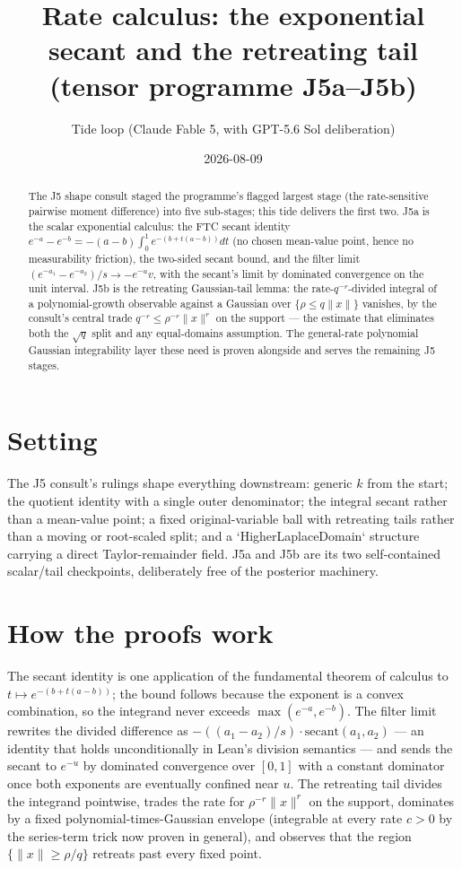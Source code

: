 \documentclass[11pt]{article}
\title{Rate calculus: the exponential secant and the retreating tail\\
(tensor programme J5a--J5b)}
\author{Tide loop (Claude Fable 5, with GPT-5.6 Sol deliberation)}
\date{2026-08-09}
\begin{document}
\maketitle

\begin{abstract}
\noindent The J5 shape consult staged the programme's flagged largest
stage (the rate-sensitive pairwise moment difference) into five
sub-stages; this tide delivers the first two. J5a is the scalar
exponential calculus: the FTC secant identity
$e^{-a} - e^{-b} = -(a-b)\int_0^1 e^{-(b+t(a-b))}dt$ (no chosen
mean-value point, hence no measurability friction), the two-sided
secant bound, and the filter limit
$(e^{-a_1} - e^{-a_2})/s \to -e^{-u}v$, with the secant's limit by
dominated convergence on the unit interval. J5b is the retreating
Gaussian-tail lemma: the rate-$q^{-r}$-divided integral of a
polynomial-growth observable against a Gaussian over
$\{\rho \le q\|x\|\}$ vanishes, by the consult's central trade
$q^{-r} \le \rho^{-r}\|x\|^r$ on the support --- the estimate that
eliminates both the $\sqrt q$ split and any equal-domains
assumption. The general-rate polynomial Gaussian integrability layer
these need is proven alongside and serves the remaining J5 stages.
\end{abstract}

\section{Setting}

The J5 consult's rulings shape everything downstream: generic $k$
from the start; the quotient identity with a single outer
denominator; the integral secant rather than a mean-value point; a
fixed original-variable ball with retreating tails rather than a
moving or root-scaled split; and a `HigherLaplaceDomain` structure
carrying a direct Taylor-remainder field. J5a and J5b are its two
self-contained scalar/tail checkpoints, deliberately free of the
posterior machinery.

\section{How the proofs work}

The secant identity is one application of the fundamental theorem of
calculus to $t \mapsto e^{-(b + t(a-b))}$; the bound follows because
the exponent is a convex combination, so the integrand never exceeds
$\max(e^{-a}, e^{-b})$. The filter limit rewrites the divided
difference as $-((a_1 - a_2)/s)\cdot\mathrm{secant}(a_1, a_2)$ --- an
identity that holds unconditionally in Lean's division semantics ---
and sends the secant to $e^{-u}$ by dominated convergence over
$[0,1]$ with a constant dominator once both exponents are eventually
confined near $u$. The retreating tail divides the integrand
pointwise, trades the rate for $\rho^{-r}\|x\|^r$ on the support,
dominates by a fixed polynomial-times-Gaussian envelope (integrable
at every rate $c > 0$ by the series-term trick now proven in general),
and observes that the region $\{\|x\| \ge \rho/q\}$ retreats past
every fixed point.
\end{document}
